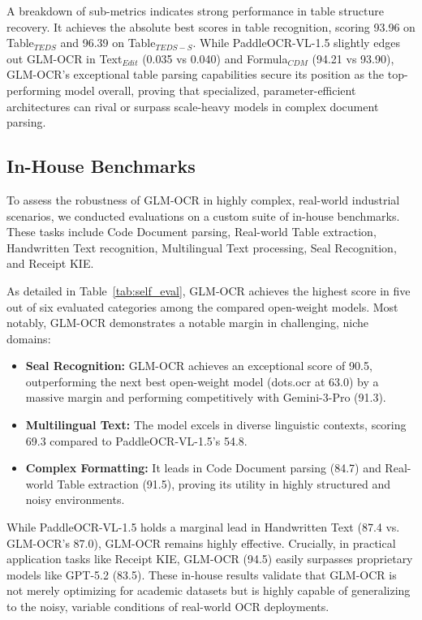 A breakdown of sub-metrics indicates strong performance in table structure recovery. It achieves the absolute best scores in table recognition, scoring 93.96 on Table$_{TEDS}$ and 96.39 on Table$_{TEDS-S}$. While PaddleOCR-VL-1.5 slightly edges out GLM-OCR in Text$_{Edit}$ (0.035 vs 0.040) and Formula$_{CDM}$ (94.21 vs 93.90), GLM-OCR's exceptional table parsing capabilities secure its position as the top-performing model overall, proving that specialized, parameter-efficient architectures can rival or surpass scale-heavy models in complex document parsing.



\subsection{In-House Benchmarks}

To assess the robustness of GLM-OCR in highly complex, real-world industrial scenarios, we conducted evaluations on a custom suite of in-house benchmarks. These tasks include Code Document parsing, Real-world Table extraction, Handwritten Text recognition, Multilingual Text processing, Seal Recognition, and Receipt KIE.



As detailed in Table~\ref{tab:self_eval}, GLM-OCR achieves the highest score in five out of six evaluated categories among the compared open-weight models. Most notably, GLM-OCR demonstrates a notable margin in challenging, niche domains:

\begin{itemize}
    \item \textbf{Seal Recognition:} GLM-OCR achieves an exceptional score of 90.5, outperforming the next best open-weight model (dots.ocr at 63.0) by a massive margin and performing competitively with Gemini-3-Pro (91.3).
    \item \textbf{Multilingual Text:} The model excels in diverse linguistic contexts, scoring 69.3 compared to PaddleOCR-VL-1.5's 54.8.
    \item \textbf{Complex Formatting:} It leads in Code Document parsing (84.7) and Real-world Table extraction (91.5), proving its utility in highly structured and noisy environments.
\end{itemize}

While PaddleOCR-VL-1.5 holds a marginal lead in Handwritten Text (87.4 vs. GLM-OCR's 87.0), GLM-OCR remains highly effective. Crucially, in practical application tasks like Receipt KIE, GLM-OCR (94.5) easily surpasses proprietary models like GPT-5.2 (83.5). These in-house results validate that GLM-OCR is not merely optimizing for academic datasets but is highly capable of generalizing to the noisy, variable conditions of real-world OCR deployments.